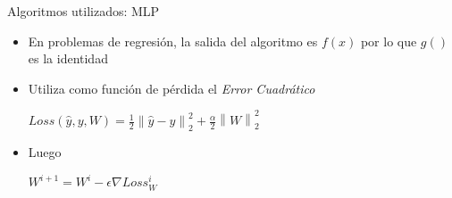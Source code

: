 \documentclass[10pt]{beamer}
\newcommand{\norm}[1]{\left\lVert#1\right\rVert}
\begin{document}
\begin{frame}{Algoritmos utilizados: MLP}
  \begin{itemize}
      \item En problemas de regresión, la salida del algoritmo es $f(x)$ por lo que $g()$ es la identidad
      \item Utiliza como función de pérdida el \textit{Error Cuadrático}
        \begin{center}
          $Loss(\hat{y}, y, W) = \frac{1}{2} \norm{\hat{y} - y}^{2}_{2} + \frac{\alpha}{2} \norm{W}^{2}_{2}$
        \end{center}
      \item Luego
      \begin{center}
        $W^{i + 1} = W^{i} - \epsilon \nabla Loss^{i}_{W}$
      \end{center}
    \end{itemize}
\end{frame}
\end{document}
